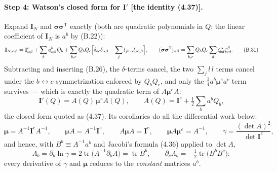 \paragraph{Step 4: Watson's closed form for $\mathbf I'$ [the identity (4.37)].}
Expand $\mathbf I_N$ and $\boldsymbol\sigma\boldsymbol\sigma^{\mathsf T}$ exactly (both are quadratic polynomials in $Q$; the linear coefficient of $\mathbf I_N$ is $a^b$ by (B.22)):
\begin{equation}
\mathbf I_{N,\alpha\beta}=\mathbf I^{e}_{\alpha\beta}+\sum_ba^{b}_{\alpha\beta}Q_b
+\sum_{b,c}Q_bQ_c\Bigl[\delta_{bc}\delta_{\alpha\beta}-\sum_jl_{jb,\alpha}l_{jc,\beta}\Bigr],
\qquad
(\boldsymbol\sigma\boldsymbol\sigma^{\mathsf T})_{\alpha\beta}=\sum_{b,c}Q_bQ_c\sum_d\zeta^{\alpha}_{bd}\zeta^{\beta}_{cd}. \tag{B.31}
\end{equation}
Subtracting and inserting (B.26), the $\delta$-terms cancel, the two $\sum_jl\,l$ terms cancel under the $b\!\leftrightarrow\!c$ symmetrization enforced by $Q_bQ_c$, and only the $\tfrac14a^b\boldsymbol\mu^{e}a^c$ term survives --- which is exactly the quadratic term of $A\boldsymbol\mu^{e}A$:
\begin{equation}
\boxed{\;\mathbf I'(Q)=A(Q)\,\boldsymbol\mu^{e}A(Q),\qquad A(Q)=\mathbf I^{e}+\tfrac12\sum_ba^{b}Q_b ,\;} \tag{B.32}
\end{equation}
the closed form quoted as (4.37). Its corollaries do all the differential work below:
\begin{equation}
\boldsymbol\mu=A^{-1}\mathbf I^{e}A^{-1},\qquad
\boldsymbol\mu A=A^{-1}\mathbf I^{e},\qquad
A\boldsymbol\mu A=\mathbf I^{e},\qquad
\boldsymbol\mu A\boldsymbol\mu^{e}=A^{-1},\qquad
\gamma=\frac{(\det A)^{2}}{\det\mathbf I^{e}} , \tag{B.33}
\end{equation}
and hence, with $B^{b}\equiv A^{-1}a^{b}$ and Jacobi's formula (4.36) applied to $\det A$,
\begin{equation}
\Lambda_b=\partial_b\ln\gamma=2\operatorname{tr}\bigl(A^{-1}\partial_bA\bigr)=\operatorname{tr}B^{b},
\qquad
\partial_c\Lambda_b=-\tfrac12\operatorname{tr}\bigl(B^{b}B^{c}\bigr): \tag{B.34}
\end{equation}
every derivative of $\gamma$ and $\boldsymbol\mu$ reduces to the \emph{constant} matrices $a^{b}$.

